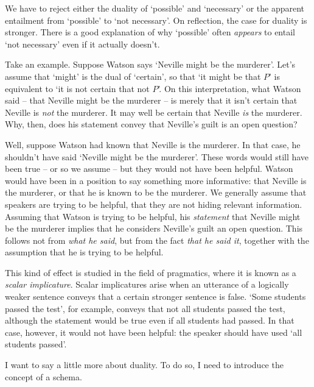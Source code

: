 
We have to reject either the duality of `possible' and `necessary' or the
apparent entailment from `possible' to `not necessary'. On reflection, the case
for duality is stronger. There is a good explanation of why `possible' often
\emph{appears} to entail `not necessary' even if it actually doesn't.


Take an example. Suppose Watson says `Neville might be the murderer'. Let's
assume that `might' is the dual of `certain', so that `it might be that $P$' is
equivalent to `it is not certain that not $P$'. On this interpretation, what
Watson said -- that Neville might be the murderer -- is merely that it isn't
certain that Neville is \emph{not} the murderer. It may well be certain that
Neville \emph{is} the murderer. Why, then, does his statement convey that
Neville's guilt is an open question?


Well, suppose Watson had known that Neville is the murderer. In that case, he
shouldn't have said `Neville might be the murderer'. These words would still
have been true -- or so we assume -- but they would not have been helpful.
Watson would have been in a position to say something more informative: that
Neville is the murderer, or that he is known to be the murderer. We generally
assume that speakers are trying to be helpful, that they are not hiding relevant
information. Assuming that Watson is trying to be helpful, his \emph{statement}
that Neville might be the murderer implies that he considers Neville's guilt an
open question. This follows not from \emph{what he said}, but from the fact
\emph{that he said it}, together with the assumption that he is trying to be
helpful.


This kind of effect is studied in the field of pragmatics, where it is known as
a \emph{scalar implicature}. Scalar implicatures arise when an utterance of a
logically weaker sentence conveys that a certain stronger sentence is false.
`Some students passed the test', for example, conveys that not all students
passed the test, although the statement would be true even if all students had
passed. In that case, however, it would not have been helpful: the speaker
should have used `all students passed'.


I want to say a little more about duality. To do so, I need to introduce the
concept of a schema.


